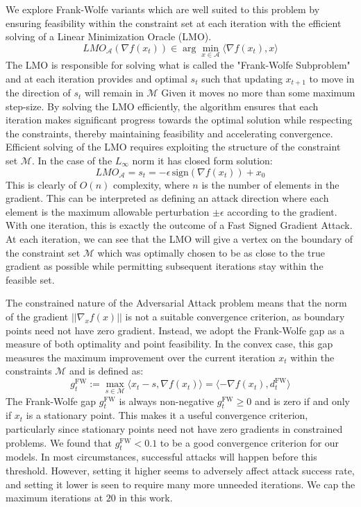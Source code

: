 \documentclass{article}
\begin{document}
We explore Frank-Wolfe variants which are well suited to this problem by ensuring feasibility within the constraint set at each iteration with the efficient solving of a Linear Minimization Oracle (LMO). 
$$
LMO_\mathcal{A}(\nabla f(x_t)) \in \arg \min_{x \in \mathcal{A}} \langle \nabla f(x_t), x\rangle
$$
The LMO is responsible for solving what is called the "Frank-Wolfe Subproblem" and at each iteration provides and optimal $s_t$ such that updating $x_{t+1}$ to move in the direction of $s_t$ will remain in $\mathcal{M}$ Given it moves no more than some maximum step-size. By solving the LMO efficiently, the algorithm ensures that each iteration makes significant progress towards the optimal solution while respecting the constraints, thereby maintaining feasibility and accelerating convergence. 
Efficient solving of the LMO requires exploiting the structure of the constraint set $\mathcal{M}$. In the case of the $L_\infty$ norm it has closed form solution:
$$LMO_\mathcal{A} = s_t = -\epsilon \, \text{sign}(\nabla f(x_t)) + x_0$$
This is clearly of $O(n)$ complexity, where $n$ is the number of elements in the gradient. This can be interpreted as defining an attack direction where each element is the maximum allowable perturbation $\pm \epsilon$ according to the gradient. With one iteration, this is exactly the outcome of a Fast Signed Gradient Attack. At each iteration, we can see that the LMO will give a vertex on the boundary of the constraint set $\mathcal{M}$ which was optimally chosen to be as close to the true gradient as possible while permitting subsequent iterations stay within the feasible set.


The constrained nature of the Adversarial Attack problem means that the norm of the gradient $||\nabla_x f(x)||$ is not a suitable convergence criterion, as boundary points need not have zero gradient. Instead, we adopt the Frank-Wolfe gap as a measure of both optimality and point feasibility. In the convex case, this gap measures the maximum improvement over the current iteration $x_t$ within the constraints $\mathcal{M}$ and is defined as:
$$g_t^{\text{FW}} := \max_{s \in \mathcal{M}} \langle x_t - s, \nabla f(x_t) \rangle = \langle -\nabla f(x_t), d_t^{\text{FW}} \rangle$$
The Frank-Wolfe gap $g_t^{\text{FW}}$ is always non-negative $g_t^{\text{FW}} \geq 0$ and is zero if and only if $x_t$ is a stationary point. This makes it a useful convergence criterion, particularly since stationary points need not have zero gradients in constrained problems. We found that $g_t^\text{FW} < 0.1$ to be a good convergence criterion for our models. In most circumstances, successful attacks will happen before this threshold. However, setting it higher seems to adversely affect attack success rate, and setting it lower is seen to require many more unneeded iterations. We cap the maximum iterations at $20$ in this work.
\end{document}
